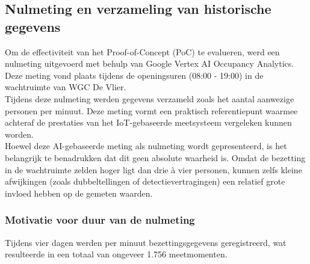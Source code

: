 

\subsection{Nulmeting en verzameling van historische gegevens}
Om de effectiviteit van het Proof-of-Concept (PoC) te evalueren, werd een nulmeting uitgevoerd met behulp van Google Vertex AI Occupancy Analytics. Deze meting vond plaats tijdens de openingsuren (08:00 - 19:00) in de wachtruimte van WGC De Vlier. \\

Tijdens deze nulmeting werden gegevens verzameld zoals het aantal aanwezige personen per minuut. Deze meting vormt een praktisch referentiepunt waarmee achteraf de prestaties van het IoT-gebaseerde meetsysteem vergeleken kunnen worden. \\

Hoewel deze AI-gebaseerde meting als nulmeting wordt gepresenteerd, is het belangrijk te benadrukken dat dit geen absolute waarheid is. Omdat de bezetting in de wachtruimte zelden hoger ligt dan drie à vier personen, kunnen zelfs kleine afwijkingen (zoals dubbeltellingen of detectievertragingen) een relatief grote invloed hebben op de gemeten waarden. 

\subsubsection{Motivatie voor duur van de nulmeting}
Tijdens vier dagen werden per minuut bezettingsgegevens geregistreerd, wat resulteerde in een totaal van ongeveer 1.756 meetmomenten. %

